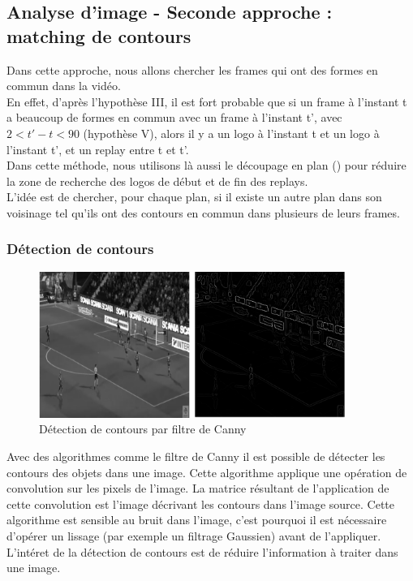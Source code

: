\documentclass[11pt]{article}
\begin{document}
\subsection{Analyse d'image - Seconde approche : matching de contours}
\label{sec:org6fed55c}
Dans cette approche, nous allons chercher les frames qui ont des formes en commun dans la vidéo.\\
En effet, d'après l'hypothèse III, il est fort probable que si un frame à l'instant t a beaucoup de formes en commun avec un frame à l'instant t', avec \(2 < t' - t < 90\) (hypothèse V), alors il y a un logo à l'instant t et un logo à l'instant t', et un replay entre t et t'.\\

Dans cette méthode, nous utilisons là aussi le découpage en plan (\cite{Abd_Almageed_2008}) pour réduire la zone de recherche des logos de début et de fin des replays.\\

L'idée est de chercher, pour chaque plan, si il existe un autre plan dans son voisinage tel qu'ils ont des contours en commun dans plusieurs de leurs frames.\\

\subsubsection{Détection de contours}
\label{sec:orgda741cd}
\begin{figure}[htbp]
\centering
\includegraphics[width=10cm]{canny_edge2.png}
\caption{Détection de contours par filtre de Canny}
\end{figure}
Avec des algorithmes comme le filtre de Canny il est possible de détecter les contours des objets dans une image. Cette algorithme applique une opération de convolution sur les pixels de l'image. La matrice résultant de l'application de cette convolution est l'image décrivant les contours dans l'image source. Cette algorithme est sensible au bruit dans l'image, c'est pourquoi il est nécessaire d'opérer un lissage (par exemple un filtrage Gaussien) avant de l'appliquer.\\
L'intéret de la détection de contours est de réduire l'information à traiter dans une image.\\
\end{document}
